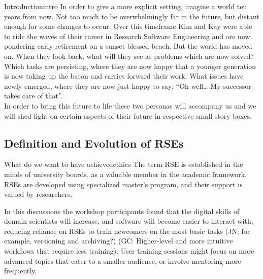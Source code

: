 \documentclass{eceasst}
\begin{document}
\begin{story}{Introduction}{intro}
In order to give a more explicit setting, imagine a world ten years from now.
Not too much to be overwhelmingly far in the future, but distant enough for some changes to occur.
Over this timeframe Kim\cite{Anzt2021} and Kay\cite{Goth2024}
were able to ride the waves of their career in Research Software Engineering and are now pondering early retirement on a sunset blessed beach.
But the world has moved on.
When they look back, what will they see as problems which are now solved?
Which tasks are persisting, where they are now happy that a younger generation is now taking up the baton and carries forward their work.
What issues have newly emerged, where they are now just happy to say: “Oh well… My successor takes care of that”.\\
In order to bring this future to life these two personas will accompany us and we will shed light on certain aspects
of their future in respective small story boxes.
 \end{story}


\subsection{Definition and Evolution of RSEs}
\begin{whatis}{What do we want to have achieved}{ethics}
The term RSE is established in the minds of university boards, as a valuable member in the academic framework.
RSEs are developed using specialized master's program, and their support is valued by researchers.
\end{whatis}
In this discussions the workshop participants found that
the digital skills of domain scientists will increase,
and software will become easier to interact with,
reducing reliance on RSEs to train newcomers on the most basic tasks
(JN: for example, versioning and archiving?)
(GC: Higher-level and more intuitive workflows that require less training).
User training sessions might focus on more advanced topics
that cater to a smaller audience, or involve mentoring more frequently.
\end{document}
